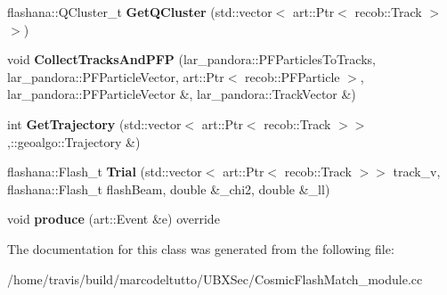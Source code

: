 \begin{DoxyCompactItemize}
\item 
\hypertarget{classCosmicFlashMatch_a04fb198244e86fbd2cb6c6f6a0ef1363}{flashana\-::\-Q\-Cluster\-\_\-t {\bfseries \-Get\-Q\-Cluster} (std\-::vector$<$ art\-::\-Ptr$<$ recob\-::\-Track $>$$>$)}\label{classCosmicFlashMatch_a04fb198244e86fbd2cb6c6f6a0ef1363}

\item 
\hypertarget{classCosmicFlashMatch_a29112dc33d6ce0be700ad02f967d709d}{void {\bfseries \-Collect\-Tracks\-And\-P\-F\-P} (lar\-\_\-pandora\-::\-P\-F\-Particles\-To\-Tracks, lar\-\_\-pandora\-::\-P\-F\-Particle\-Vector, art\-::\-Ptr$<$ recob\-::\-P\-F\-Particle $>$, lar\-\_\-pandora\-::\-P\-F\-Particle\-Vector \&, lar\-\_\-pandora\-::\-Track\-Vector \&)}\label{classCosmicFlashMatch_a29112dc33d6ce0be700ad02f967d709d}

\item 
\hypertarget{classCosmicFlashMatch_a3208db108dea02a5c7113205137ea363}{int {\bfseries \-Get\-Trajectory} (std\-::vector$<$ art\-::\-Ptr$<$ recob\-::\-Track $>$$>$,\-::geoalgo\-::\-Trajectory \&)}\label{classCosmicFlashMatch_a3208db108dea02a5c7113205137ea363}

\item 
\hypertarget{classCosmicFlashMatch_ac329a3c7f942e9c7d26ecee88f91c8ea}{flashana\-::\-Flash\-\_\-t {\bfseries \-Trial} (std\-::vector$<$ art\-::\-Ptr$<$ recob\-::\-Track $>$$>$ track\-\_\-v, flashana\-::\-Flash\-\_\-t flash\-Beam, double \&\-\_\-chi2, double \&\-\_\-ll)}\label{classCosmicFlashMatch_ac329a3c7f942e9c7d26ecee88f91c8ea}

\item 
\hypertarget{classCosmicFlashMatch_aebcbe54d9d6fc9e14b98a008d7776308}{void {\bfseries produce} (art\-::\-Event \&e) override}\label{classCosmicFlashMatch_aebcbe54d9d6fc9e14b98a008d7776308}

\end{DoxyCompactItemize}


\-The documentation for this class was generated from the following file\-:\begin{DoxyCompactItemize}
\item 
/home/travis/build/marcodeltutto/\-U\-B\-X\-Sec/\-Cosmic\-Flash\-Match\-\_\-module.\-cc\end{DoxyCompactItemize}
